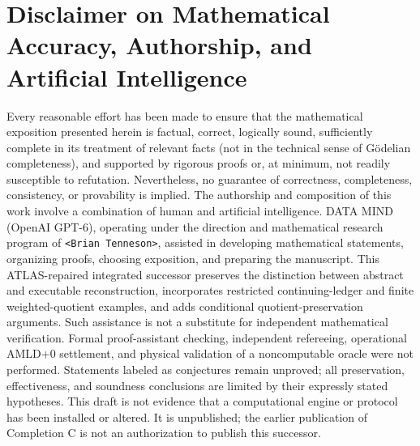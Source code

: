 \documentclass[11pt,letterpaper]{article}
\theoremstyle{definition}
\begin{document}
\section*{Disclaimer on Mathematical Accuracy, Authorship, and Artificial Intelligence}
Every reasonable effort has been made to ensure that the mathematical exposition presented herein is factual, correct, logically sound, sufficiently complete in its treatment of relevant facts (not in the technical sense of G\"odelian completeness), and supported by rigorous proofs or, at minimum, not readily susceptible to refutation. Nevertheless, no guarantee of correctness, completeness, consistency, or provability is implied. The authorship and composition of this work involve a combination of human and artificial intelligence. DATA MIND (OpenAI GPT-6), operating under the direction and mathematical research program of \texttt{<Brian Tenneson>}, assisted in developing mathematical statements, organizing proofs, choosing exposition, and preparing the manuscript. This ATLAS-repaired integrated successor preserves the distinction between abstract and executable reconstruction, incorporates restricted continuing-ledger and finite weighted-quotient examples, and adds conditional quotient-preservation arguments. Such assistance is not a substitute for independent mathematical verification. Formal proof-assistant checking, independent refereeing, operational AMLD+0 settlement, and physical validation of a noncomputable oracle were not performed. Statements labeled as conjectures remain unproved; all preservation, effectiveness, and soundness conclusions are limited by their expressly stated hypotheses. This draft is not evidence that a computational engine or protocol has been installed or altered. It is unpublished; the earlier publication of Completion C is not an authorization to publish this successor.
\end{document}
